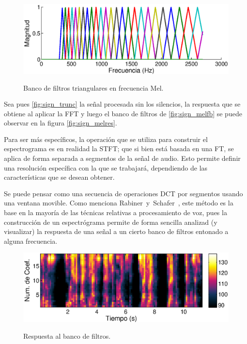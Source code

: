 \begin{figure}[t]
  \myfloatalign
  {\includegraphics[width=0.9\linewidth]{gfx/chap2/mfcc_filterbank}} \quad
  \caption{Banco de filtros triangulares en frecuencia Mel.}
  \label{fig:sign_melfb}
\end{figure}  

Sea pues \autoref{fig:sign_trunc} la señal procesada sin los silencios, la respuesta que se obtiene al aplicar la \ac{FFT} y luego el banco de filtros de \autoref{fig:sign_melfb} se puede observar en la figura \autoref{fig:sign_melres}.

Para ser más específicos, la operación que se utiliza para construir el espectrograma es en realidad la \ac{STFT}; que si bien está basada en una \ac{FT}, se aplica de forma separada a segmentos de la señal de audio. Esto permite definir una resolución específica con la que se trabajará, dependiendo de las características que se desean obtener. 

Se puede pensar como una secuencia de operaciones \ac{DCT} por segmentos usando una ventana movible. Como menciona Rabiner~y~Schafer~\cite{Rabiner2007}, este método es la base en la mayoría de las técnicas relativas a procesamiento de voz, pues la construcción de un espectrógrama permite de forma sencilla analizad (y visualizar) la respuesta de una señal a un cierto banco de filtros entonado a alguna frecuencia.

\begin{figure}[t]
  \myfloatalign
  {\includegraphics[width=0.9\linewidth]{gfx/chap2/mfcc_result2}} \quad
  \caption{Respuesta al banco de filtros.}
  \label{fig:sign_melres}
\end{figure}

